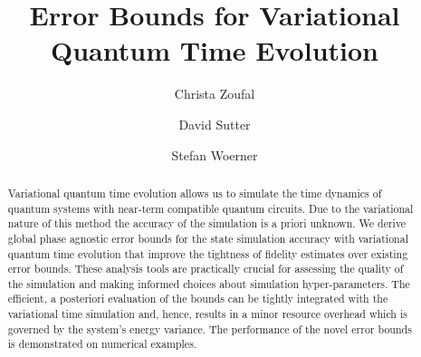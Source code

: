 \documentclass[twocolumn, aps, pra, superscriptaddress]{revtex4-1}
\begin{document}
\title{Error Bounds for Variational Quantum Time Evolution}
\author{Christa Zoufal}
\author{David Sutter}
\author{Stefan Woerner}

\begin{abstract}
Variational quantum time evolution allows us to simulate the time dynamics of quantum systems with near-term compatible quantum circuits. 
Due to the variational nature of this method the accuracy of the simulation is a priori unknown.
We derive global phase agnostic error bounds for the state simulation accuracy with variational quantum time evolution that improve the tightness of fidelity estimates over existing error bounds. 
These analysis tools are practically crucial for assessing the quality of the simulation and making informed choices about simulation hyper-parameters.
The efficient, a posteriori evaluation of the bounds can be tightly integrated with the variational time simulation and, hence, results in a minor resource overhead which is governed by the system's energy variance.
The performance of the novel error bounds is demonstrated on numerical examples.
\end{abstract}


\maketitle
\end{document}
